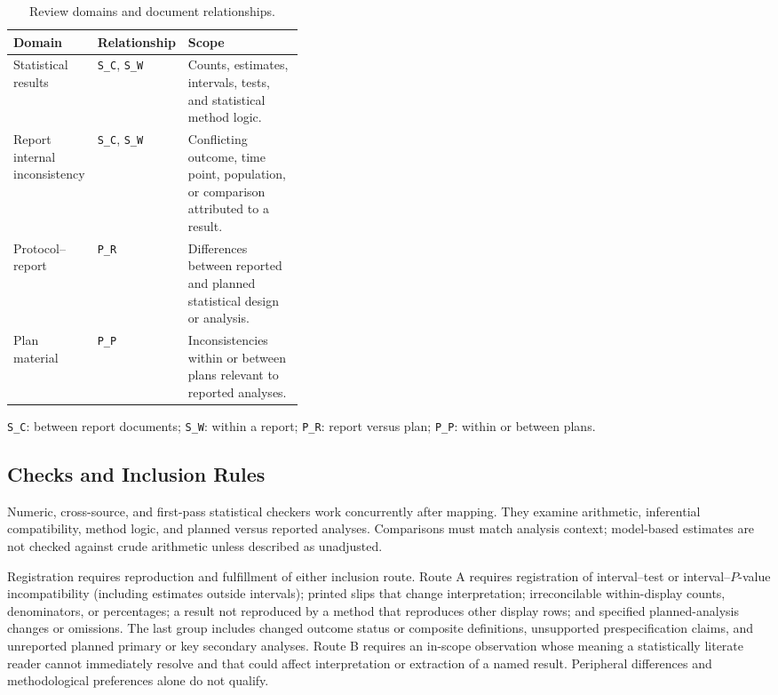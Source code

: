 \documentclass[12pt,a4paper]{article}
\begin{document}
\begin{table}[htbp]
\centering\small
\caption{Review domains and document relationships.}
\label{tab:review-domains}
\begin{tabularx}{\linewidth}{@{}p{0.24\linewidth}p{0.14\linewidth}X@{}}
\toprule
Domain & Relationship & Scope \\
\midrule
Statistical results & \texttt{S\_C}, \texttt{S\_W} & Counts, estimates, intervals, tests, and statistical method logic. \\
Report internal inconsistency & \texttt{S\_C}, \texttt{S\_W} & Conflicting outcome, time point, population, or comparison attributed to a result. \\
Protocol--report & \texttt{P\_R} & Differences between reported and planned statistical design or analysis. \\
Plan material & \texttt{P\_P} & Inconsistencies within or between plans relevant to reported analyses. \\
\bottomrule
\end{tabularx}
\par\smallskip\footnotesize
\texttt{S\_C}: between report documents; \texttt{S\_W}: within a report; \texttt{P\_R}: report versus plan; \texttt{P\_P}: within or between plans.
\end{table}

\subsection{Checks and Inclusion Rules}
\label{sec:framework-inclusion}

Numeric, cross-source, and first-pass statistical checkers work concurrently after mapping. They examine arithmetic, inferential compatibility, method logic, and planned versus reported analyses. Comparisons must match analysis context; model-based estimates are not checked against crude arithmetic unless described as unadjusted.

Registration requires reproduction and fulfillment of either inclusion route. Route A requires registration of interval--test or interval--\(P\)-value incompatibility (including estimates outside intervals); printed slips that change interpretation; irreconcilable within-display counts, denominators, or percentages; a result not reproduced by a method that reproduces other display rows; and specified planned-analysis changes or omissions. The last group includes changed outcome status or composite definitions, unsupported prespecification claims, and unreported planned primary or key secondary analyses. Route B requires an in-scope observation whose meaning a statistically literate reader cannot immediately resolve and that could affect interpretation or extraction of a named result. Peripheral differences and methodological preferences alone do not qualify.
\end{document}
